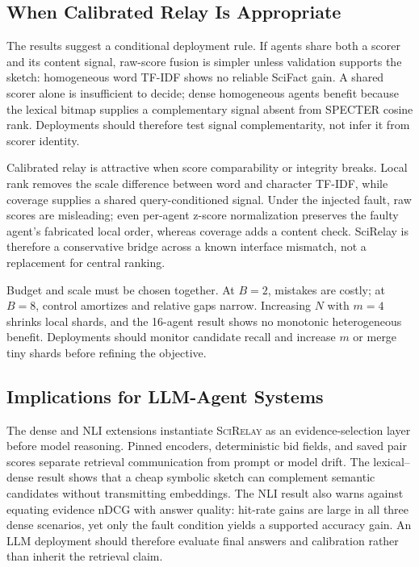 \documentclass[sigconf]{acmart}
\newcommand{\method}{\textsc{SciRelay}}
\begin{document}
\subsection{When Calibrated Relay Is Appropriate}

The results suggest a conditional deployment rule. If agents share both a scorer and its content signal, raw-score fusion is simpler unless validation supports the sketch: homogeneous word TF-IDF shows no reliable SciFact gain. A shared scorer alone is insufficient to decide; dense homogeneous agents benefit because the lexical bitmap supplies a complementary signal absent from SPECTER cosine rank. Deployments should therefore test signal complementarity, not infer it from scorer identity.

Calibrated relay is attractive when score comparability or integrity breaks. Local rank removes the scale difference between word and character TF-IDF, while coverage supplies a shared query-conditioned signal. Under the injected fault, raw scores are misleading; even per-agent z-score normalization preserves the faulty agent's fabricated local order, whereas coverage adds a content check. SciRelay is therefore a conservative bridge across a known interface mismatch, not a replacement for central ranking.

Budget and scale must be chosen together. At $B=2$, mistakes are costly; at $B=8$, control amortizes and relative gaps narrow. Increasing $N$ with $m=4$ shrinks local shards, and the 16-agent result shows no monotonic heterogeneous benefit. Deployments should monitor candidate recall and increase $m$ or merge tiny shards before refining the objective.

\subsection{Implications for LLM-Agent Systems}

The dense and NLI extensions instantiate \method{} as an evidence-selection layer before model reasoning. Pinned encoders, deterministic bid fields, and saved pair scores separate retrieval communication from prompt or model drift. The lexical--dense result shows that a cheap symbolic sketch can complement semantic candidates without transmitting embeddings. The NLI result also warns against equating evidence nDCG with answer quality: hit-rate gains are large in all three dense scenarios, yet only the fault condition yields a supported accuracy gain. An LLM deployment should therefore evaluate final answers and calibration rather than inherit the retrieval claim.
\end{document}

